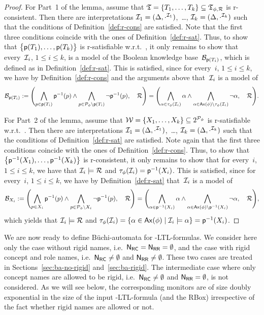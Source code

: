 \begin{proof}
    For Part~1 of the lemma, assume that
    $\mathfrak{T}=\{T_1,\dots,T_k\}\subseteq\mathfrak{T}_{\phi,\mathcal{R}}$ is r-consistent.  Then
    there are interpretations $\mathcal{I}_1=(\Delta,\cdot^{\mathcal{I}_1})$,~\dots,
    $\mathcal{I}_k=(\Delta,\cdot^{\mathcal{I}_k})$ such that the conditions of
    Definition~\ref{def:r-cons} are satisfied.  Note that the first three
    conditions coincide with the ones of Definition~\ref{def:r-sat}.  Thus, to
    show that $\bigl\{\mathsf{p}(T_1),\dots,\mathsf{p}(T_k)\bigr\}$ is r-satisfiable
    w.r.t.~\Rmc, it only remains to show that every~$\mathcal{I}_i$, $1\le i\le k$, is
    a model of the Boolean knowledge base~$\mathcal{B}_{\mathsf{p}(T_i)}$, which is defined
    as in Definition~\ref{def:r-sat}.  This is satisfied, since for every~$i$,
    $1\le i\le k$, we have by Definition~\ref{def:r-cons} and the arguments
    above that~$\mathcal{I}_i$ is a model of
    \[\Bmc_{\psf(T_i)}:=%
        \Biggl(\bigwedge_{p\in\psf(T_i)}\psf^{-1}(p)\land%
        \bigwedge_{p\in\Pmc_\phi\setminus\psf(T_i)}\lnot\psf^{-1}(p),\quad\Rmc\Biggr)=%
        \Biggl(\bigwedge_{\alpha\in\tau_\phi(\Imc_i)}\alpha\land%
        \bigwedge_{\alpha\in\Ax(\phi)\setminus\tau_\phi(\Imc_i)}\lnot\alpha,\quad\Rmc\Biggr).\]

    For Part~2 of the lemma, assume that
    $\mathcal{W}=\{X_1,\dots,X_k\}\subseteq 2^{\mathcal{P}_\phi}$ is r-satisfiable
    w.r.t.~\Rmc.  Then there are interpretations
    $\mathcal{I}_1=(\Delta,\cdot^{\mathcal{I}_1})$,~\dots, $\mathcal{I}_k=(\Delta,\cdot^{\mathcal{I}_k})$
    such that the conditions of Definition~\ref{def:r-sat} are satisfied.  Note
    again that the first three conditions coincide with the ones of
    Definition~\ref{def:r-cons}.  Thus, to show that
    $\bigl\{\mathsf{p}^{-1}(X_1),\dots,\mathsf{p}^{-1}(X_k)\bigr\}$ is r-consistent, it only
    remains to show that for every~$i$, $1\le i\le k$, we have that
    $\mathcal{I}_i\models\mathcal{R}$ and $\tau_\phi(\mathcal{I}_i)=\mathsf{p}^{-1}(X_i)$.  This is
    satisfied, since for every~$i$, $1\le i\le k$, we have by
    Definition~\ref{def:r-sat} that~$\mathcal{I}_i$ is a model of
    \[\Bmc_{X_i}:=%
        \Biggl(\bigwedge_{p\in X_i}\psf^{-1}(p)\land%
        \bigwedge_{p\in\Pmc_\phi\setminus X_i}\lnot\psf^{-1}(p),\quad\Rmc\Biggr)=%
        \Biggl(\bigwedge_{\alpha\in\psf^{-1}(X_i)}\alpha\land%
        \bigwedge_{\alpha\in\Ax(\phi)\setminus\psf^{-1}(X_i)}\lnot\alpha,\quad\Rmc\Biggr),\]
    which yields that $\mathcal{I}_i\models\mathcal{R}$ and
    $\tau_\phi(\mathcal{I}_i)=\{\alpha\in\operatorname{\mathsf{Ax}}(\phi)\mid\mathcal{I}_i\models\alpha\}=\mathsf{p}^{-1}(X_i)$.
\end{proof}

\noindent
We are now ready to define Büchi-automata for \SHOQ-LTL-formulas.
%
We consider here only the case without rigid names, i.e.~$\mathsf{N_{RC}}=\mathsf{N_{RR}}=\emptyset$,
and the case with rigid concept and role names, i.e.~$\mathsf{N_{RC}}\ne\emptyset$ and
$\mathsf{N_{RR}}\ne\emptyset$.  These two cases are treated in
Sections~\ref{sec:ba-no-rigid} and~\ref{sec:ba-rigid}.
%
The intermediate case where only concept names are allowed to be rigid,
i.e.~$\mathsf{N_{RC}}\ne\emptyset$ and $\mathsf{N_{RR}}=\emptyset$, is not considered.  As we will see
below, the corresponding monitors are of size doubly exponential in the size of
the input \SHOQ-LTL-formula (and the RBox) irrespective of the fact whether
rigid names are allowed or not.


